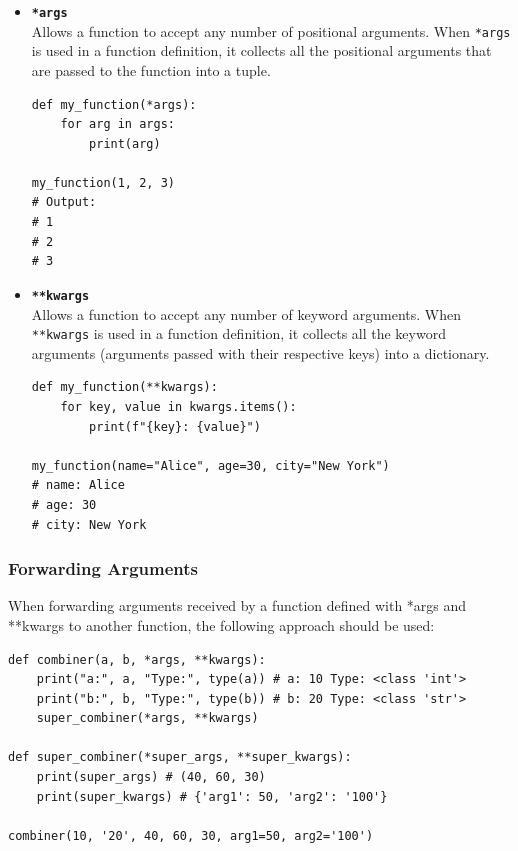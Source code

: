 \begin{itemize}
\item \textbf{\texttt{*args}}\\
Allows a function to accept any number of positional arguments. When \texttt{*args} is used in a function definition, it collects all the positional arguments that are passed to the function into a tuple.\\

\begin{codebox}
\begin{verbatim}
def my_function(*args):
    for arg in args:
        print(arg)

my_function(1, 2, 3)
# Output:
# 1
# 2
# 3
\end{verbatim}
\end{codebox}
\vspace{0.5em}
\item \textbf{\texttt{**kwargs}}\\
Allows a function to accept any number of keyword arguments. When \texttt{**kwargs} is used in a function definition, it collects all the keyword arguments (arguments passed with their respective keys) into a dictionary.\\

\begin{codebox}
\begin{verbatim}
def my_function(**kwargs):
    for key, value in kwargs.items():
        print(f"{key}: {value}")

my_function(name="Alice", age=30, city="New York")
# name: Alice
# age: 30
# city: New York
\end{verbatim}
\end{codebox}
\end{itemize}

\subsubsection{Forwarding Arguments}
When forwarding arguments received by a function defined with *args and **kwargs to another function, the following approach should be used:

\begin{codebox}
\begin{verbatim}
def combiner(a, b, *args, **kwargs):
    print("a:", a, "Type:", type(a)) # a: 10 Type: <class 'int'>
    print("b:", b, "Type:", type(b)) # b: 20 Type: <class 'str'>
    super_combiner(*args, **kwargs)

def super_combiner(*super_args, **super_kwargs):
    print(super_args) # (40, 60, 30)
    print(super_kwargs) # {'arg1': 50, 'arg2': '100'}

combiner(10, '20', 40, 60, 30, arg1=50, arg2='100')
\end{verbatim}
\end{codebox}

